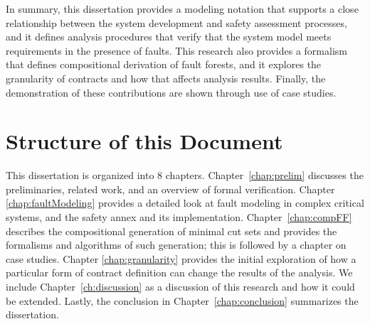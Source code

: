 In summary, this dissertation provides a modeling notation that supports a close relationship between the system development and safety assessment processes, and it defines analysis procedures that verify that the system model meets requirements in the presence of faults. This research also provides a formalism that defines compositional derivation of fault forests, and it explores the granularity of contracts and how that affects analysis results. Finally, the demonstration of these contributions are shown through use of case studies. 

\section{Structure of this Document}
This dissertation is organized into 8 chapters. Chapter~\ref{chap:prelim} discusses the preliminaries, related work, and an overview of formal verification. Chapter \ref{chap:faultModeling} provides a detailed look at fault modeling in complex critical systems, and the safety annex and its implementation. Chapter~\ref{chap:compFF} describes the compositional generation of minimal cut sets and provides the formalisms and algorithms of such generation; this is followed by a chapter on case studies. Chapter \ref{chap:granularity} provides the initial exploration of how a particular form of contract definition can change the results of the analysis. We include Chapter~\ref{ch:discussion} as a discussion of this research and how it could be extended. Lastly, the conclusion in Chapter~\ref{chap:conclusion} summarizes the dissertation.











